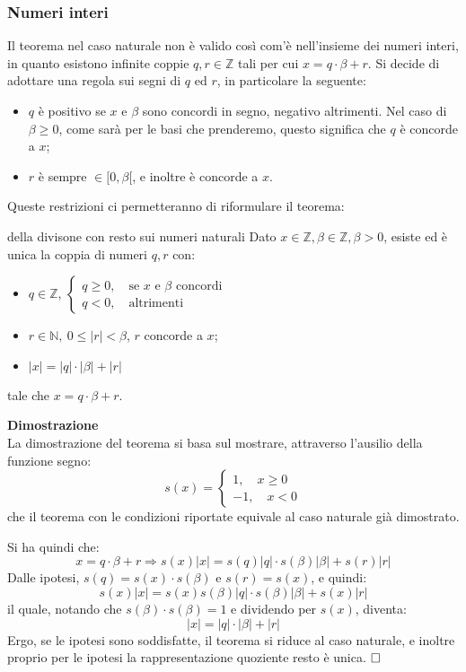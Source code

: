 \documentclass[a4paper,11pt]{article}
\begin{document}
\subsubsection{Numeri interi}
Il teorema nel caso naturale non è valido così com'è nell'insieme dei numeri interi, in quanto esistono infinite coppie $q, r \in \mathbb{Z}$ tali per cui $x = q \cdot \beta + r$.
Si decide di adottare una regola sui segni di $q$ ed $r$, in particolare la seguente:
\begin{itemize}
	\item $q$ è positivo se $x$ e $\beta$ sono concordi in segno, negativo altrimenti. Nel caso di $\beta \geq 0$, come sarà per le basi che prenderemo, questo significa che $q$ è concorde a $x$;
	\item $r$ è sempre $\in [0,\beta[$, e inoltre è concorde a $x$. 
\end{itemize}

Queste restrizioni ci permetteranno di riformulare il teorema:
\begin{theorem}{della divisone con resto sui numeri naturali}
	Dato $x \in \mathbb{Z}, \beta \in \mathbb{Z}, \beta > 0$, esiste ed è unica la coppia di numeri $q,r$ con:
	\begin{itemize}
		\item $q \in \mathbb{Z}$, $
			\begin{cases}
				q \geq 0, \quad \text{se $x$ e $\beta$ concordi} \\
				q < 0, \quad \text{altrimenti}
			\end{cases}
		$
		\item $r \in \mathbb{N}, \ 0 \leq |r| < \beta$, $r$ concorde a $x$;
		\item $|x| = |q| \cdot |\beta| + |r|$
	\end{itemize}
	tale che $x = q \cdot \beta + r$.
\end{theorem}

\par\medskip
\noindent
\textbf{\textsf{Dimostrazione}} \\
La dimostrazione del teorema si basa sul mostrare, attraverso l'ausilio della funzione segno:
$$
s(x) = 
	\begin{cases}
			1, \quad x \geq 0 \\ 
			-1, \quad x < 0
	\end{cases}
$$
che il teorema con le condizioni riportate equivale al caso naturale già dimostrato.

Si ha quindi che:
$$
x = q \cdot \beta + r \Rightarrow s(x) |x| = s(q) |q| \cdot s(\beta) |\beta| + s(r) |r|
$$
Dalle ipotesi, $s(q) = s(x) \cdot s(\beta)$ e $s(r) = s(x)$, e quindi:
$$
s(x) |x| = s(x) s(\beta) |q| \cdot s(\beta) |\beta| + s(x) |r|
$$
il quale, notando che $s(\beta) \cdot s(\beta) = 1$ e dividendo per $s(x)$, diventa:
$$
|x| = |q| \cdot |\beta| + |r|
$$
Ergo, se le ipotesi sono soddisfatte, il teorema si riduce al caso naturale, e inoltre proprio per le ipotesi la rappresentazione quoziente resto è unica.
$\hfill\square$
\end{document}
